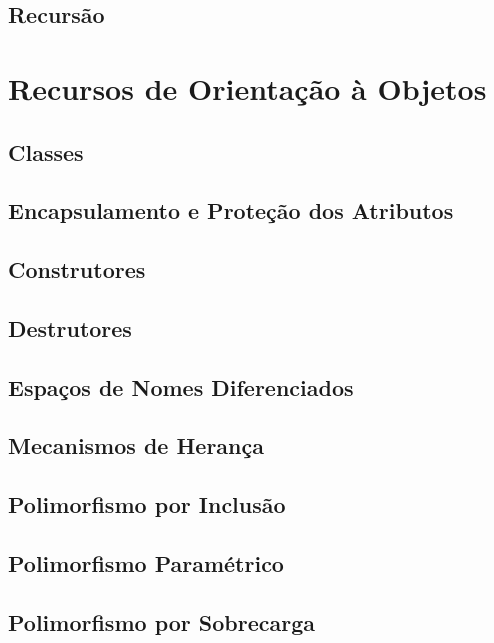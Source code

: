 \documentclass[rel_mlp]{iiufrgs}
\begin{document}
\section{Recursão}


\chapter{Recursos de Orientação à Objetos}

\section{Classes}

\section{Encapsulamento e Proteção dos Atributos}

\section{Construtores}

\section{Destrutores}

\section{Espaços de Nomes Diferenciados}

\section{Mecanismos de Herança}

\section{Polimorfismo por Inclusão}

\section{Polimorfismo Paramétrico}

\section{Polimorfismo por Sobrecarga}
\end{document}

